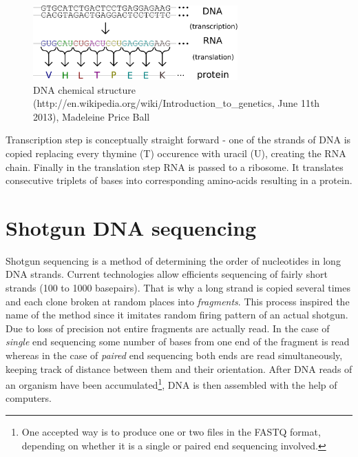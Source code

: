 \documentclass[times, utf8, diplomski]{fer}
\begin{document}
\begin{figure}[!ht]
\begin{center}
	\includegraphics[width=0.7\textwidth]{../img/Genetic_code.pdf}
	\caption{DNA chemical structure (http://en.wikipedia.org/wiki/Introduction\_to\_genetics, June 11th 2013), Madeleine Price Ball}\label{genetic.code}
\end{center}
\end{figure}

Transcription step is conceptually straight forward - one of the strands of DNA is copied replacing every thymine (T) occurence with uracil (U), creating the RNA chain. Finally in the translation step RNA is passed to a ribosome. It translates consecutive triplets of bases into corresponding amino-acids resulting in a protein. 

\section{Shotgun DNA sequencing}

Shotgun sequencing is a method of determining the order of nucleotides in long DNA strands. Current technologies allow efficients sequencing of fairly short strands (100 to 1000 basepairs). That is why a long strand is copied several times and each clone broken at random places into \emph{fragments}. This process inspired the name of the method since it imitates random firing pattern of an actual shotgun. Due to loss of precision not entire fragments are actually read. In the case of \emph{single} end sequencing some number of bases from one end of the fragment is read whereas in the case of \emph{paired} end sequencing both ends are read simultaneously, keeping track of distance between them and their orientation. After DNA reads of an organism have been accumulated\footnote{One accepted way is to produce one or two files in the FASTQ format, depending on whether it is a single or paired end sequencing involved.}, DNA is then assembled with the help of computers. 
\end{document}
